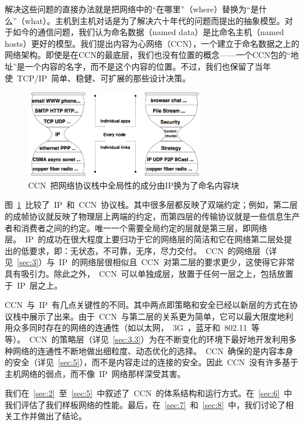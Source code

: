 解决这些问题的直接办法就是把网络中的“在哪里”（where）替换为“是什么”（what）。主机到主机对话是为了解决六十年代的问题而提出的抽象模型。对于如今的通信问题，我们认为命名数据（named data）是比命名主机（named hosts）更好的模型。我们提出内容为心网络（CCN），一个建立于命名数据之上的网络架构。即使是在CCN的最底层，我们也没有位置的概念——一个CCN包的“地址”是一个内容的名字，而不是这个内容的位置。不过，我们也保留了当年使~TCP/IP~简单、稳健、可扩展的那些设计决策。

\begin{figure}[htbp]
  \centering
  \includegraphics[width=0.7\textwidth]{images/narrow_waist}
  \caption{CCN~把网络协议栈中全局性的成分由IP换为了命名内容块} %
  \label{narrow_waist}
\end{figure}

图~\ref{narrow_waist}~比较了~IP~和~CCN~协议栈。其中很多层都反映了双端约定；例如，第二层的成帧协议就反映了物理层上两端的约定，而第四层的传输协议就是一些信息生产者和消费者之间的约定。唯一一个需要全局约定的层就是第三层，即网络层。~IP~的成功在很大程度上要归功于它的网络层的简洁和它在网络第二层处提出的低要求，即：无状态，不可靠，无序，尽力交付。~CCN~的网络层（详见~\ref{sec:3}）与~IP~的网络层很相似且~CCN~对第二层的要求更少，这使得它非常具有吸引力。除此之外，~CCN~可以单独成层，放置于任何一层之上，包括放置于~IP~层之上。%

CCN~与~IP~有几点关键性的不同。其中两点即策略和安全已经以新层的方式在协议栈中展示了出来。由于~CCN~与第二层的关系更为简单，它可以最大限度地利用众多同时存在的网络的连通性（如以太网，~3G~，蓝牙和~802.11~等等）。~CCN~的策略层（详见~\ref{sec:3.3}）为在不断变化的环境下最好地开发利用多种网络的连通性不断地做出细粒度、动态优化的选择。~CCN~确保的是内容本身的安全（详见~\ref{sec:5}），而不是内容走过的连接的安全。因此~CCN~没有许多基于主机网络的弱点，而不像~IP~网络那样深受其害。

我们在~\ref{sec:2}~至~\ref{sec:5}~中叙述了~CCN~的体系结构和运行方式。在~\ref{sec:6}~中我们评估了我们样板网络的性能。最后，在~\ref{sec:7}~和~\ref{sec:8}~中，我们讨论了相关工作并做出了结论。



